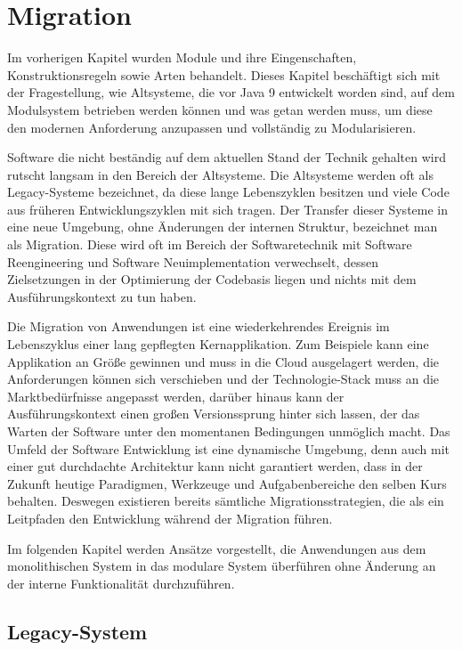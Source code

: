 
\newpage \chapter{Migration}

	Im vorherigen Kapitel wurden Module und ihre Eingenschaften, Konstruktionsregeln sowie Arten behandelt. 
	Dieses Kapitel beschäftigt sich mit der Fragestellung, wie Altsysteme, die vor Java 9 entwickelt worden sind, auf dem Modulsystem betrieben werden können und was getan werden muss, um diese den modernen Anforderung anzupassen und vollständig zu Modularisieren.\bigbreak

	Software die nicht beständig auf dem aktuellen Stand der Technik gehalten wird rutscht langsam in den Bereich der Altsysteme. Die Altsysteme werden oft als Legacy-Systeme bezeichnet, da diese lange Lebenszyklen besitzen und viele Code aus früheren Entwicklungszyklen mit sich tragen. Der Transfer dieser Systeme in eine neue Umgebung, ohne Änderungen der internen Struktur, bezeichnet man als Migration. Diese wird oft im Bereich der Softwaretechnik mit Software Reengineering und Software Neuimplementation verwechselt, dessen Zielsetzungen in der Optimierung der Codebasis liegen und nichts mit dem Ausführungskontext zu tun haben. \bigbreak

	Die Migration von Anwendungen ist eine wiederkehrendes Ereignis im Lebenszyklus einer lang gepflegten Kernapplikation.
	Zum Beispiele kann eine Applikation an Größe gewinnen und muss in die Cloud ausgelagert werden, die Anforderungen können sich verschieben und der Technologie-Stack muss an die Marktbedürfnisse angepasst werden, darüber hinaus kann der Ausführungskontext einen großen Versionssprung hinter sich lassen, der das Warten der Software unter den momentanen Bedingungen unmöglich macht. Das Umfeld der Software Entwicklung ist eine dynamische Umgebung, denn auch mit einer gut durchdachte Architektur kann nicht garantiert werden, dass in der Zukunft heutige Paradigmen, Werkzeuge und Aufgabenbereiche den selben Kurs behalten. Deswegen existieren bereits sämtliche Migrationsstrategien, die als ein Leitpfaden den Entwicklung während der Migration führen. \bigbreak

	Im folgenden Kapitel werden Ansätze vorgestellt, die Anwendungen aus dem monolithischen System in das modulare System überführen ohne Änderung an der interne Funktionalität durchzuführen. 


\section{Legacy-System}

